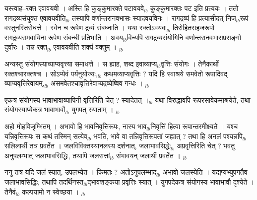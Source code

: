 \documentclass[article,12pt,a4paper]{memoir}%
\newcounter{parCount}
\begin{document}
	  
	  \pstart \leavevmode%
	यस्त्वाह--रक्त एवावयवी । अस्ति हि कुङ्कुमारक्ते पटावयवे{\tiny $_{lb}$} कुङ्कुमारक्तः पट इति प्रत्ययः । ततो रागद्रव्यसंयुक्त एवावयवीति{\tiny $_{lb}$} तस्यापि वर्णान्तरानवभासः स्यादवयविनः । रागद्रव्यं हि प्रत्यासीदत् निज{\tiny $_{lb}$}रूपं वस्तुनस्तिरोधत्ते । स्वेन च रूपेण द्रव्यं संबध्नाति । यथा रक्तोऽवयवः{\tiny $_{lb}$} तिरोहितसहजरूपो रागद्रव्यसमवायिना रूपेण संबन्धी प्रतिभाति । अवय{\tiny $_{lb}$}विन्यपि रागद्रव्यसंयोगिनि वर्णान्तरानवभासप्रसङ्गो दुर्वारः । तन्न रक्त{\tiny $_{lb}$} एवावयवीति शक्यं वक्तुम् ।
	{}
	\pend%
      {\tiny $_{lb}$}

	  
	  \pstart \leavevmode%
	अन्यस्तु संयोगस्याव्याप्यवृत्त्या समाधत्ते । स ह्याह, शब्द इवाव्याप्य{\tiny $_{lb}$}वृत्तिः संयोगः । तेनैकार्थो रक्तश्चारक्तश्च । सोऽप्येवं पर्यनुयोज्यः,{\tiny $_{lb}$} कथमव्याप्यवृत्तिः ? यदि हि स्वाश्रये समवेतो रूपादिवद् व्याप्यवृत्तिरेवायम्,{\tiny $_{lb}$} असमवेतश्चावृत्तिरेवाप्यद्रव्येष्विव गन्धः ।
	{}
	\pend%
      {\tiny $_{lb}$}

	  
	  \pstart \leavevmode%
	एकत्र संयोगस्य भावाभावाव्यापिनी वृत्तिरिति चेत् ? स्यादेतत् ।{\tiny $_{lb}$} यथा विरुद्धावपि रूपरसावेकमाश्रयेते, तथा संयोगस्याप्येकत्र भावाभावौ{\tiny $_{lb}$} युगपत् स्याताम् ।
	{}
	\pend%
      {\tiny $_{lb}$}

	  
	  \pstart \leavevmode%
	अहो मोहविजृम्भितम् । अभावो हि भावनिवृत्तिरूपः, नास्य भाव{\tiny $_{lb}$}निवृत्तिं हित्वा रूपान्तरमीक्ष्यते । यश्च यन्निवृत्तिरूपः स कथं तस्मिन् सत्येव{\tiny $_{lb}$} भवति, भावे वा तन्निवृत्तिरूपतां जह्यात् ? तथा हि अनलं पश्यन्नपि{\tiny $_{lb}$} सलिलार्थी तत्र प्रवर्तेत । जलविविक्तस्यानलस्य दर्शनात्, जलाभावसिद्धेः{\tiny $_{lb}$} \leavevmode{} अप्रवृत्तिरिति चेत् ? भवतु अनुपलम्भात् जलाभावसिद्धिः, तथापि जलसत्तां{\tiny $_{lb}$} संभावयन् जलार्थी प्रवर्तेत ।
	{}
	\pend%
      {\tiny $_{lb}$}

	  
	  \pstart \leavevmode%
	ननु तत्र यदि जलं स्यात्, उपलभ्येत । किमतः ? अतोऽनुपलम्भाद्{\tiny $_{lb}$} अभावो जलस्येति । यद्यप्यभ्युपगतैव जलाभावसिद्धिः, तथापि तदर्थिनस्त{\tiny $_{lb}$}द्भावशङ्कया प्रवृत्तिः स्यात् । युगपदेकत्र संयोगस्य भावाभावौ दृश्येते । तेनैवं{\tiny $_{lb}$} कल्पयामो न स्वेच्छया ।
	{}
	\pend%
      {\tiny $_{lb}$}
\end{document}
